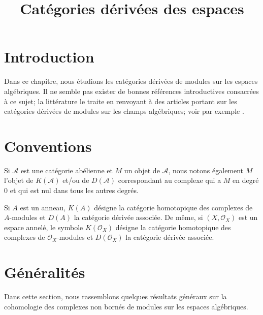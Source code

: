 

%


\title{Catégories dérivées des espaces}


\maketitle

\label{section-phantom}

\tableofcontents

\section{Introduction}
\label{section-introduction}

\noindent
Dans ce chapitre, nous étudions les catégories dérivées de modules sur les espaces algébriques.
Il ne semble pas exister de bonnes références introductives consacrées à ce sujet;
la littérature le traite en renvoyant à des articles portant sur les catégories dérivées
de modules sur les champs algébriques; voir par exemple
\cite{olsson_sheaves}.



\section{Conventions}
\label{section-conventions}

\noindent
Si $\mathcal{A}$ est une catégorie abélienne et $M$ un objet
de $\mathcal{A}$, nous notons également $M$ l'objet de $K(\mathcal{A})$
et/ou de $D(\mathcal{A})$ correspondant au complexe qui a
$M$ en degré $0$ et qui est nul dans tous les autres degrés.

\medskip\noindent
Si $A$ est un anneau, $K(A)$ désigne la catégorie homotopique
des complexes de $A$-modules et $D(A)$ la catégorie dérivée associée.
De même, si $(X, \mathcal{O}_X)$ est un espace annelé, le symbole
$K(\mathcal{O}_X)$ désigne la catégorie homotopique des complexes de
$\mathcal{O}_X$-modules et $D(\mathcal{O}_X)$ la catégorie dérivée
associée.





\section{Généralités}
\label{section-generalities}

\noindent
Dans cette section, nous rassemblons quelques résultats généraux sur la cohomologie des
complexes non bornés de modules sur les espaces algébriques.

